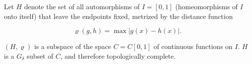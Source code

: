 Let $H$ denote the set of all automorphisms of $I = [0, 1]$ (homeomorphisms of $I$ onto itself) that leave the endpoints fixed, metrized by the distance function

$$\varrho(g, h) = \max |g(x) - h(x)|.$$

$(H, \varrho)$ is a subspace of the space $C = C[0, 1]$ of continuous functions on $I$. $H$ is a $G_\delta$ subset of $C$, and therefore topologically complete.

